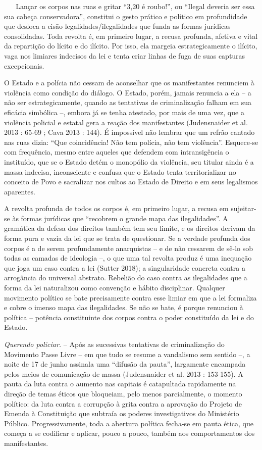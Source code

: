 ~ ~ Lançar os corpos nas ruas e gritar ``3,20 é roubo!'', ou ``Ilegal
deveria ser essa sua cabeça conservadora'', constitui o gesto prático e
político em profundidade que desloca a cisão legalidades/ilegalidades
que funda as formas jurídicas consolidadas. Toda revolta é, em primeiro
lugar, a recusa profunda, afetiva e vital da repartição do lícito e do
ilícito. Por isso, ela margeia estrategicamente o ilícito, vaga nos
limiares indecisos da lei e tenta criar linhas de fuga de suas capturas
excepcionais.

O Estado e a polícia não cessam de aconselhar que os manifestantes
renunciem à violência como condição do diálogo. O Estado, porém, jamais
renuncia a ela -- a não ser estrategicamente, quando as tentativas de
criminalização falham em sua eficácia simbólica --, embora já se tenha
atestado, por mais de uma vez, que a violência policial e estatal gera a
reação dos manifestantes (Judensnaider et al. 2013 : 65-69 ; Cava 2013 :
144). É impossível não lembrar que um refrão cantado nas ruas dizia:
``Que coincidência! Não tem polícia, não tem violência''. Esquece-se com
frequência, mesmo entre aqueles que defendem com intransigência o
instituído, que se o Estado detém o monopólio da violência, seu titular
ainda é a massa indecisa, inconsciente e confusa que o Estado tenta
territorializar no conceito de Povo e sacralizar nos cultos ao Estado de
Direito e em seus legalismos aparentes.

A revolta profunda de todos os corpos é, em primeiro lugar, a recusa em
sujeitar-se às formas jurídicas que ``recobrem o grande mapa das
ilegalidades''. A gramática da defesa dos direitos também tem seu
limite, e os direitos derivam da forma pura e vazia da lei que se trata
de questionar. Se a verdade profunda dos corpos é a de serem
profundamente anarquistas -- e de não cessarem de sê-lo sob todas as
camadas de ideologia --, o que uma tal revolta produz é uma inequação
que joga um caso contra a lei (Sutter 2018); a singularidade concreta
contra a arrogância do universal abstrato. Rebelião do caso contra as
ilegalidades que a forma da lei naturalizou como convenção e hábito
disciplinar. Qualquer movimento político se bate precisamente contra
esse limiar em que a lei formaliza e cobre o imenso mapa das
ilegalidades. Se não se bate, é porque renunciou à política -- potência
constituinte dos corpos contra o poder constituído da lei e do Estado.

\emph{Querendo policiar.} -- Após as sucessivas tentativas de
criminalização do Movimento Passe Livre -- em que tudo se resume a
vandalismo sem sentido --, a noite de 17 de junho assinala uma ``difusão
da pauta'', largamente encampada pelos meios de comunicação de massa
(Judensnaider et al. 2013 : 153-155). A pauta da luta contra o aumento
nas capitais é catapultada rapidamente na direção de temas éticos que
bloqueiam, pelo menos parcialmente, o momento político: da luta contra a
corrupção à grita contra a aprovação do Projeto de Emenda à Constituição
que subtraía os poderes investigativos do Ministério Público.
Progressivamente, toda a abertura política fecha-se em pauta ética, que
começa a se codificar e aplicar, pouco a pouco, também aos
comportamentos dos manifestantes.

